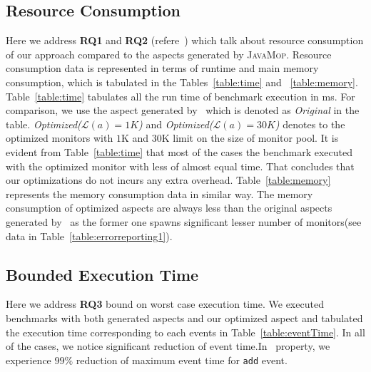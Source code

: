 

\subsection{Resource Consumption}
\label{sec:evaluation:resource}


Here we address \textbf{RQ1} and \textbf{RQ2} (refere~)
which talk about resource consumption of our approach compared to the aspects
generated by \textsc{JavaMop}. Resource consumption data is represented in terms
of runtime and main memory consumption, which is tabulated in the
Tables~\ref{table:time} and ~\ref{table:memory}. Table~\ref{table:time}
tabulates all the run time of benchmark execution in ms. For comparison, we use
the aspect generated by \javamop\ which is denoted as \emph{Original} in the
table. \emph{Optimized($\mathcal{L}(a) = 1K$)} and
\emph{Optimized($\mathcal{L}(a) = 30K$)} denotes to the optimized monitors with
$1$K and $30$K limit on the size of monitor pool.
It is evident from Table~\ref{table:time} that most of the cases the benchmark
executed with the optimized monitor with less of almost equal time. That
concludes that our optimizations do not incurs any extra overhead.
Table~\ref{table:memory} represents the memory consumption data in similar way.
The memory consumption of optimized aspects are always less than the original
aspects generated by \javamop\ as the former one spawns significant lesser number
of monitors(see data in Table~\ref{table:errorreporting1}).


\subsection{Bounded Execution Time}
\label{sec:evaluation:bounded}

Here we address \textbf{RQ3} \ie bound on worst case execution time. We executed
\bloat benchmarks with both \javamop generated aspects and our optimized aspect
and tabulated the execution time corresponding to each events in
Table~\ref{table:eventTime}. In all of the cases, we notice significant
reduction of event time.In \hashset\ property, we experience $99\%$ reduction of
maximum event time for \texttt{add} event.



